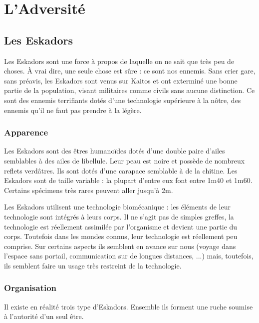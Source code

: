 \part{L'Adversité}

\chapter{Les Eskadors}

\begin{multicols}{2}

Les Eskadors sont une force à propos de laquelle on ne sait que très peu de choses. À vrai dire, une seule chose est sûre : ce sont nos ennemis. Sans crier gare, sans préavis, les Eskadors sont venus sur Kaitos et ont exterminé une bonne partie de la population, visant militaires comme civils sans aucune distinction. Ce sont des ennemis terrifiants dotés d'une technologie supérieure à la nôtre, des ennemis qu'il ne faut pas prendre à la légère.

\section{Apparence}

Les Eskadors sont des êtres humanoïdes dotés d'une double paire d'ailes semblables à des ailes de libellule. Leur peau est noire et possède de nombreux reflets verdâtres. Ils sont dotés d'une carapace semblable à de la chitine. Les Eskadors sont de taille variable : la plupart d'entre eux font entre 1m40 et 1m60. Certains spécimens très rares peuvent aller jusqu'à 2m. 

Les Eskadors utilisent une technologie biomécanique : les éléments de leur technologie sont intégrés à leurs corps. Il ne s'agit pas de simples greffes, la technologie est réellement assimilée par l'organisme et devient une partie du corps. Toutefois dans les mondes connus, leur technologie est réellement peu comprise. Sur certains aspects ils semblent en avance sur nous (voyage dans l'espace sans portail, communication sur de longues distances, ...) mais, toutefois, ils semblent faire un usage très restreint de la technologie.

\section{Organisation}

Il existe en réalité trois type d'Eskadors. Ensemble ils forment une ruche soumise à l'autorité d'un seul être.
\begin{itemize}


\end{itemize}
\end{multicols}
